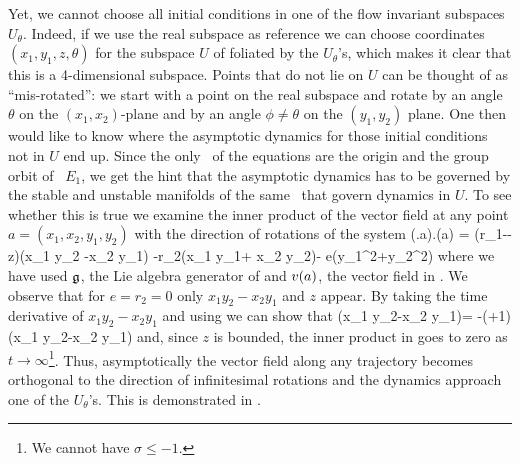 Yet, we cannot choose all initial conditions
in one of the flow invariant subspaces $U_\theta$. Indeed, if we use the real subspace
as reference we can choose coordinates $(x_1,y_1,z,\theta)$ for the subspace $U$ of 
foliated by the $U_\theta$'s, which makes it clear that this is a 4-dimensional subspace.
Points that do not lie on $U$ can be thought of as ``mis-rotated'': we start with a point on
the real subspace and rotate by an angle $\theta$ on the $(x_1,x_2)$-plane and by an
angle $\phi\neq\theta$ on the $(y_1,y_2)$ plane. One then would like to know where the asymptotic dynamics
for those initial conditions not in $U$ end up. Since the only \eqva\ of the equations are the origin
and the group orbit of \eqv\ $E_1$, we get the hint that the asymptotic dynamics has to be governed
by the stable and unstable manifolds of the same \eqva\ that govern dynamics in $U$.
To see whether this is true we examine the inner product of the vector field at any point  $a=(x_1,x_2,y_1,y_2)$  with the direction of
rotations of the system
\beq
	(\Lg.a).\vf(a) = \left(r_1-\sigma-z\right)\left(x_1 y_2 -x_2 y_1\right) -r_2\left(x_1 y_1+ x_2 y_2\right)- e\left(y_1^2+y_2^2\right)
	\label{eq:CLe0ip}
\eeq
where we have used $\mathfrak{g}$, the Lie algebra generator of  and $v(a)$, the vector field in .
We observe that for $e=r_2=0$ only $x_1 y_2-x_2 y_1$ and $z$ appear. By taking the time derivative of $x_1 y_2-x_2 y_1$ and using 
we can show that
\beq
	\left(x_1 y_2-x_2 y_1\right)= -(\sigma+1)\left(x_1 y_2-x_2 y_1\right)
\eeq
and, since $z$ is bounded, the inner product in  goes to zero as $t\rightarrow\infty$\footnote{We cannot have $\sigma\leq -1$.}. Thus, asymptotically the vector
field along any trajectory becomes orthogonal to the direction of infinitesimal rotations and the dynamics approach one of the $U_\theta$'s.
This is demonstrated in .

